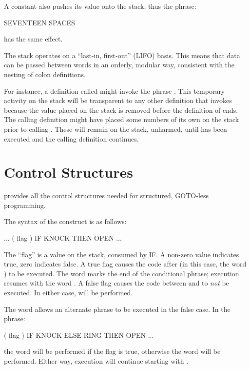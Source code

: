 A constant also pushes its value onto the stack; thus the phrase:
\begin{Code}
SEVENTEEN SPACES
\end{Code}
has the same effect.

The stack operates on a ``last-in, first-out'' (LIFO) basis.  This means
that data can be passed between words in an orderly, modular way,
consistent with the nesting of colon definitions.

For instance, a definition called  might invoke the phrase
.  This temporary activity on the stack will be
transparent to any other definition that invokes  because the
value placed on the stack is removed before the definition of 
ends.  The calling definition might have placed some numbers of its own on
the stack prior to calling .  These will remain on the stack,
unharmed, until  has been executed and the calling definition
continues.

\section{Control Structures}
\Forth{} provides all the control structures%
%
needed for structured, GOTO-less programming.

The syntax of the  construct is as follows:
\begin{Code}
... ( flag ) IF  KNOCK  THEN  OPEN ...
\end{Code}
The ``flag'' is a value on the stack, consumed by IF. A
non-zero value indicates true, zero indicates false.  A true flag causes
the code after  (in this case, the word ) to be
executed.  The word  marks the end of the conditional phrase;
execution resumes with the word .  A false flag causes the
code between  and  to {\em not} be executed.  In
either case,  will be performed.

The word  allows an alternate phrase to be
executed in the false case. In the phrase:
\begin{Code}
( flag ) IF KNOCK  ELSE  RING  THEN  OPEN ...
\end{Code}
the word  will be performed if the flag is true, otherwise
the word  will be performed.  Either way, execution will
continue starting with .

